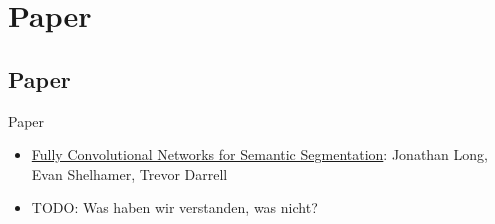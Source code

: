 \section{Paper}

\subsection{Paper}

\begin{frame}{Paper}
    \begin{itemize}
        \item \href{http://arxiv.org/abs/1411.4038}{Fully Convolutional Networks for Semantic Segmentation}:
              Jonathan Long, Evan Shelhamer, Trevor Darrell
        \item TODO: Was haben wir verstanden, was nicht?
    \end{itemize}
\end{frame}